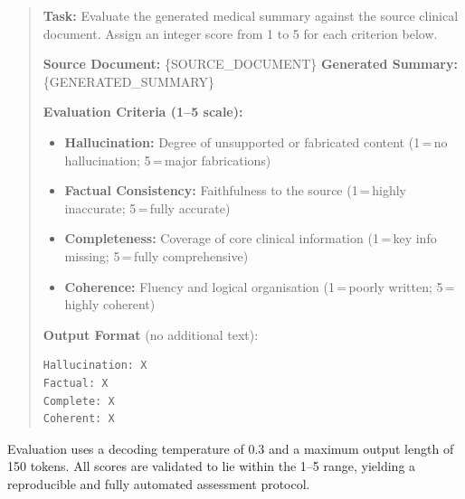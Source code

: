 \documentclass{article}
\begin{document}
\begin{quote}\small
\textbf{Task:} Evaluate the generated medical summary against the source clinical document. Assign an integer score from 1 to 5 for each criterion below.

\medskip
\textbf{Source Document:} \{SOURCE\_DOCUMENT\} \quad \textbf{Generated Summary:} \{GENERATED\_SUMMARY\}

\medskip
\textbf{Evaluation Criteria (1--5 scale):}
\begin{itemize}[noitemsep]
    \item \textbf{Hallucination:} Degree of unsupported or fabricated content (1\,=\,no hallucination; 5\,=\,major fabrications)
    \item \textbf{Factual Consistency:} Faithfulness to the source (1\,=\,highly inaccurate; 5\,=\,fully accurate)
    \item \textbf{Completeness:} Coverage of core clinical information (1\,=\,key info missing; 5\,=\,fully comprehensive)
    \item \textbf{Coherence:} Fluency and logical organisation (1\,=\,poorly written; 5\,=\,highly coherent)
\end{itemize}

\medskip
\textbf{Output Format} (no additional text):
\begin{verbatim}
Hallucination: X
Factual: X
Complete: X
Coherent: X
\end{verbatim}
\end{quote}

Evaluation uses a decoding temperature of 0.3 and a maximum output length of 150 tokens. All scores are validated to lie within the 1--5 range, yielding a reproducible and fully automated assessment protocol.



\end{document}
